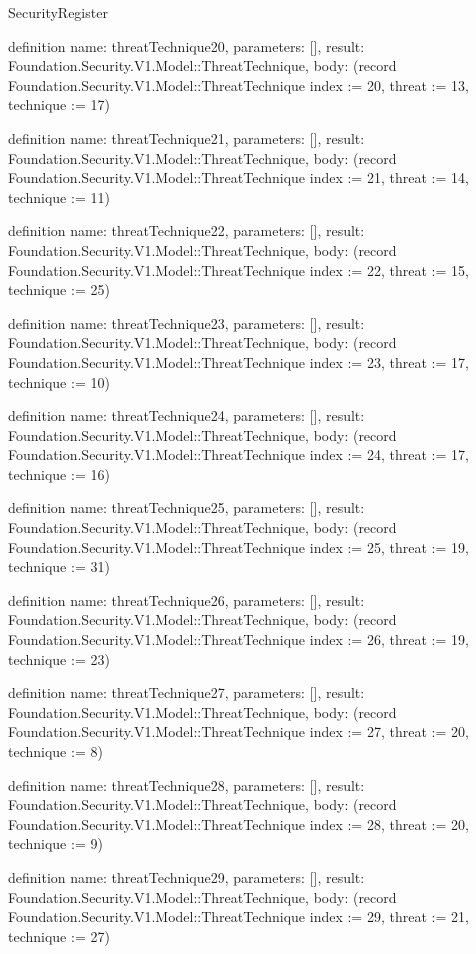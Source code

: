 \begin{lexlean}{SecurityRegister}
\begin{semanticmodule}
definition{
  name: threatTechnique20,
  parameters: [],
  result: Foundation.Security.V1.Model::ThreatTechnique,
  body: (record Foundation.Security.V1.Model::ThreatTechnique {index := 20, threat := 13, technique := 17})
}

definition{
  name: threatTechnique21,
  parameters: [],
  result: Foundation.Security.V1.Model::ThreatTechnique,
  body: (record Foundation.Security.V1.Model::ThreatTechnique {index := 21, threat := 14, technique := 11})
}

definition{
  name: threatTechnique22,
  parameters: [],
  result: Foundation.Security.V1.Model::ThreatTechnique,
  body: (record Foundation.Security.V1.Model::ThreatTechnique {index := 22, threat := 15, technique := 25})
}

definition{
  name: threatTechnique23,
  parameters: [],
  result: Foundation.Security.V1.Model::ThreatTechnique,
  body: (record Foundation.Security.V1.Model::ThreatTechnique {index := 23, threat := 17, technique := 10})
}

definition{
  name: threatTechnique24,
  parameters: [],
  result: Foundation.Security.V1.Model::ThreatTechnique,
  body: (record Foundation.Security.V1.Model::ThreatTechnique {index := 24, threat := 17, technique := 16})
}

definition{
  name: threatTechnique25,
  parameters: [],
  result: Foundation.Security.V1.Model::ThreatTechnique,
  body: (record Foundation.Security.V1.Model::ThreatTechnique {index := 25, threat := 19, technique := 31})
}

definition{
  name: threatTechnique26,
  parameters: [],
  result: Foundation.Security.V1.Model::ThreatTechnique,
  body: (record Foundation.Security.V1.Model::ThreatTechnique {index := 26, threat := 19, technique := 23})
}

definition{
  name: threatTechnique27,
  parameters: [],
  result: Foundation.Security.V1.Model::ThreatTechnique,
  body: (record Foundation.Security.V1.Model::ThreatTechnique {index := 27, threat := 20, technique := 8})
}

definition{
  name: threatTechnique28,
  parameters: [],
  result: Foundation.Security.V1.Model::ThreatTechnique,
  body: (record Foundation.Security.V1.Model::ThreatTechnique {index := 28, threat := 20, technique := 9})
}

definition{
  name: threatTechnique29,
  parameters: [],
  result: Foundation.Security.V1.Model::ThreatTechnique,
  body: (record Foundation.Security.V1.Model::ThreatTechnique {index := 29, threat := 21, technique := 27})
}


\end{semanticmodule}
\end{lexlean}
